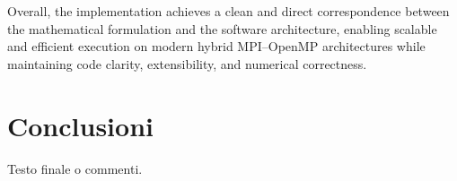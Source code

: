 \documentclass[12pt]{article}
\begin{document}
Overall, the implementation achieves a clean and direct correspondence between the mathematical formulation and the software architecture, enabling scalable and efficient execution on modern hybrid MPI--OpenMP architectures while maintaining code clarity, extensibility, and numerical correctness.


\section{Conclusioni}

Testo finale o commenti.
\end{document}

